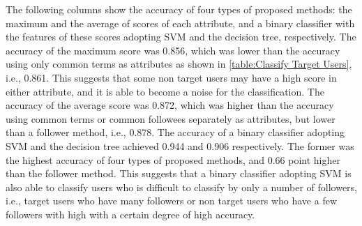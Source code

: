 The following columns show the accuracy of four types of proposed
methods: the maximum and the average of scores of each attribute,
and a binary classifier with the features of these scores adopting
SVM and the decision tree, respectively.  The accuracy of the
maximum score was 0.856, which was lower than the accuracy using only
common terms as attributes as shown in \ref{table:Classify Target
Users}, i.e., 0.861.  This suggests that some non
target users may have a high score in either attribute, and it is able
to become a noise for the classification.  The accuracy of the average
score was 0.872, which was higher than the accuracy using common
terms or common followees separately as attributes, but lower than a follower
method, i.e., 0.878.  The accuracy of a binary classifier adopting SVM and the
decision tree achieved 0.944 and 0.906 respectively.  The former was the
highest accuracy of four types of proposed methods, and 0.66
point higher than the follower method.  This suggests that a binary classifier
adopting SVM is also able to classify users who is difficult to classify by
only a number of followers, i.e., target users who have many followers or non
target users who have a few followers with high with a
certain degree of high accuracy.


